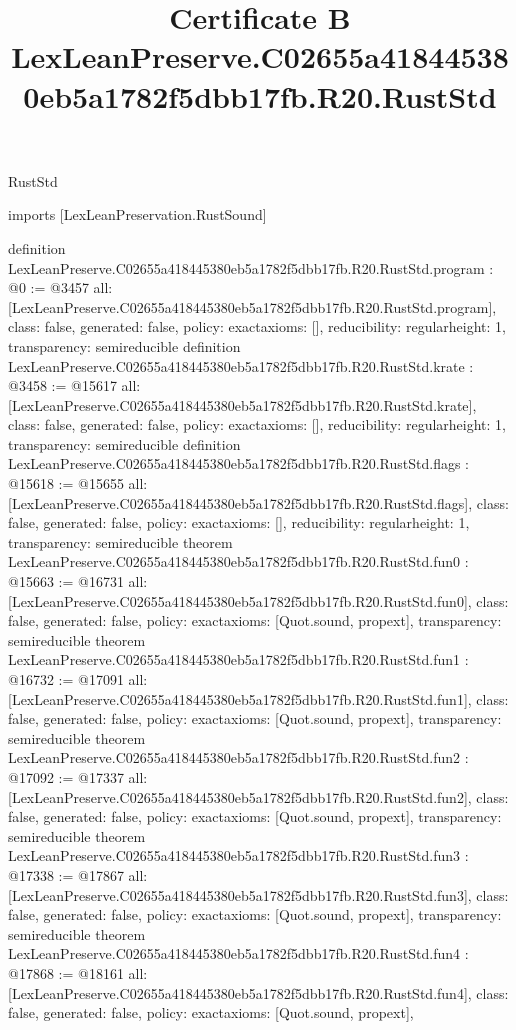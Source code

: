 \begin{lexlean}{RustStd}
\title{Certificate B LexLeanPreserve.C02655a418445380eb5a1782f5dbb17fb.R20.RustStd}
\begin{coremodule}
imports [LexLeanPreservation.RustSound]

definition LexLeanPreserve.C02655a418445380eb5a1782f5dbb17fb.R20.RustStd.program : @0 := @3457 {
  all: [LexLeanPreserve.C02655a418445380eb5a1782f5dbb17fb.R20.RustStd.program],
  class: false,
  generated: false,
  policy: exact{axioms: []},
  reducibility: regular{height: 1},
  transparency: semireducible
}
definition LexLeanPreserve.C02655a418445380eb5a1782f5dbb17fb.R20.RustStd.krate : @3458 := @15617 {
  all: [LexLeanPreserve.C02655a418445380eb5a1782f5dbb17fb.R20.RustStd.krate],
  class: false,
  generated: false,
  policy: exact{axioms: []},
  reducibility: regular{height: 1},
  transparency: semireducible
}
definition LexLeanPreserve.C02655a418445380eb5a1782f5dbb17fb.R20.RustStd.flags : @15618 := @15655 {
  all: [LexLeanPreserve.C02655a418445380eb5a1782f5dbb17fb.R20.RustStd.flags],
  class: false,
  generated: false,
  policy: exact{axioms: []},
  reducibility: regular{height: 1},
  transparency: semireducible
}
theorem LexLeanPreserve.C02655a418445380eb5a1782f5dbb17fb.R20.RustStd.fun0 : @15663 := @16731 {
  all: [LexLeanPreserve.C02655a418445380eb5a1782f5dbb17fb.R20.RustStd.fun0],
  class: false,
  generated: false,
  policy: exact{axioms: [Quot.sound, propext]},
  transparency: semireducible
}
theorem LexLeanPreserve.C02655a418445380eb5a1782f5dbb17fb.R20.RustStd.fun1 : @16732 := @17091 {
  all: [LexLeanPreserve.C02655a418445380eb5a1782f5dbb17fb.R20.RustStd.fun1],
  class: false,
  generated: false,
  policy: exact{axioms: [Quot.sound, propext]},
  transparency: semireducible
}
theorem LexLeanPreserve.C02655a418445380eb5a1782f5dbb17fb.R20.RustStd.fun2 : @17092 := @17337 {
  all: [LexLeanPreserve.C02655a418445380eb5a1782f5dbb17fb.R20.RustStd.fun2],
  class: false,
  generated: false,
  policy: exact{axioms: [Quot.sound, propext]},
  transparency: semireducible
}
theorem LexLeanPreserve.C02655a418445380eb5a1782f5dbb17fb.R20.RustStd.fun3 : @17338 := @17867 {
  all: [LexLeanPreserve.C02655a418445380eb5a1782f5dbb17fb.R20.RustStd.fun3],
  class: false,
  generated: false,
  policy: exact{axioms: [Quot.sound, propext]},
  transparency: semireducible
}
theorem LexLeanPreserve.C02655a418445380eb5a1782f5dbb17fb.R20.RustStd.fun4 : @17868 := @18161 {
  all: [LexLeanPreserve.C02655a418445380eb5a1782f5dbb17fb.R20.RustStd.fun4],
  class: false,
  generated: false,
  policy: exact{axioms: [Quot.sound, propext]},
}
\end{coremodule}
\end{lexlean}
